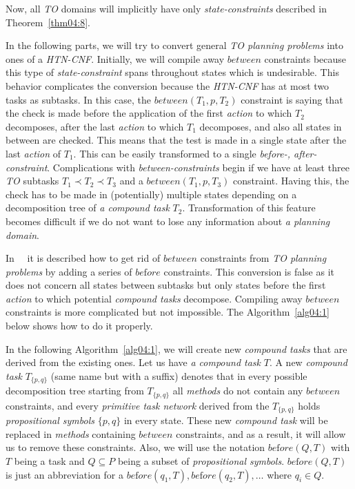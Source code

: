 \medskip\noindent
Now, all \emph{TO} domains will implicitly have only \emph{state-constraints} described in Theorem~\ref{thm04:8}.

\medskip\noindent\label{rem-between-two-tasks}
In the following parts, we will try to convert general \emph{TO planning problems} into ones of a \emph{HTN-CNF}. Initially, we will compile away $between$ constraints because this type of \emph{state-constraint} spans throughout states which is undesirable. This behavior complicates the conversion because the \emph{HTN-CNF} has at most two tasks as subtasks. In this case, the $between(T_1, p, T_2)$ constraint is saying that the check is made before the application of the first \emph{action} to which $T_2$ decomposes, after the last \emph{action} to which $T_1$ decomposes, and also all states in between are checked. This means that the test is made in a single state after the last \emph{action} of $T_1$. This can be easily transformed to a single \emph{before-, after-constraint}. Complications with \emph{between-constraints} begin if we have at least three \emph{TO} subtasks $T_1 \prec T_2 \prec T_3$ and a $between(T_1, p, T_3)$ constraint. Having this, the check has to be made in (potentially) multiple states depending on a decomposition tree of \emph{a compound task} $T_2$. Transformation of this feature becomes difficult if we do not want to lose any information about \emph{a planning domain}.

\medskip\noindent
In~\cite{ondrckova2023semantics}~\cite{ondrckova2024empty} it is described how to get rid of $between$ constraints from \emph{TO planning problems} by adding a series of $be\text{f}ore$ constraints. This conversion is false as it does not concern all states between subtasks but only states before the first \emph{action} to which potential \emph{compound tasks} decompose. Compiling away $between$ constraints is more complicated but not impossible. The Algorithm~\ref{alg04:1} below shows how to do it properly.

\medskip\noindent
In the following Algorithm~\ref{alg04:1}, we will create new \emph{compound tasks} that are derived from the existing ones. Let us have \emph{a compound task} $T$. A new \emph{compound task} $T_{\{p, q\}}$ (same name but with a suffix) denotes that in every possible decomposition tree starting from $T_{\{p, q\}}$ all \emph{methods} do not contain any $between$ constraints, and every \emph{primitive task network} derived from the $T_{\{p, q\}}$ holds \emph{propositional symbols} $\{p, q\}$ in every state. These new \emph{compound task} will be replaced in \emph{methods} containing $between$ constraints, and as a result, it will allow us to remove these constraints. Also, we will use the notation $be\text{f}ore(Q, T)$ with $T$ being a task and $Q \subseteq P$ being a subset of \emph{propositional symbols}. $be\text{f}ore(Q, T)$ is just an abbreviation for a $be\text{f}ore(q_1, T), be\text{f}ore(q_2, T), \dots$ where $q_i \in Q$.

